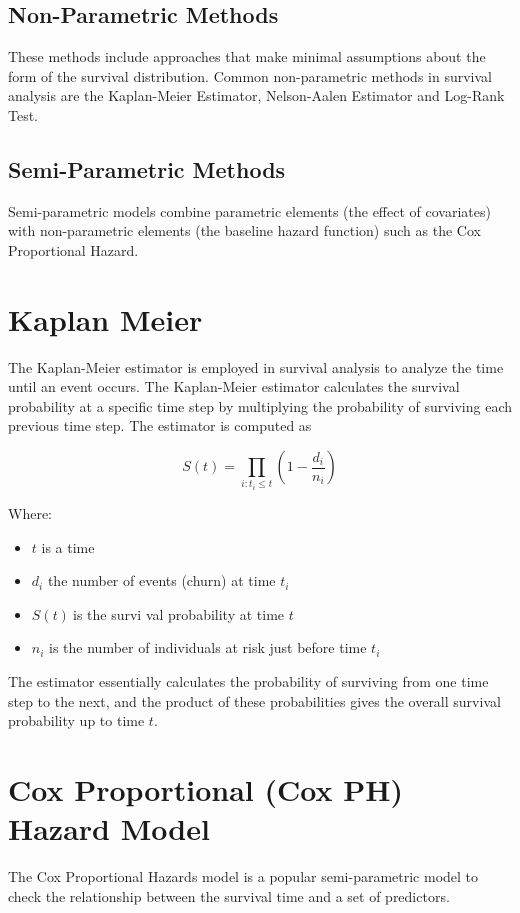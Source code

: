 \documentclass[doublespacing]{report} %
\begin{document}
\subsection{Non-Parametric Methods}

These methods include approaches that make minimal assumptions about the form of the survival distribution. Common non-parametric methods in survival analysis are the Kaplan-Meier Estimator, Nelson-Aalen Estimator and Log-Rank Test.

\subsection{Semi-Parametric Methods}

Semi-parametric models combine parametric elements (the effect of covariates) with non-parametric elements (the baseline hazard function) such as the Cox Proportional Hazard.

\section{Kaplan Meier}
The Kaplan-Meier estimator is employed in survival analysis to analyze the time until an event occurs. The Kaplan-Meier estimator calculates the survival probability at a specific time step by multiplying the probability of surviving each previous time step.
The estimator is computed as

\[S\left(t\right)=\prod_{i:t_i\le t}\left(1-\frac{d_i}{n_i}\right)\]

Where:
 \begin{itemize}
     \item \(t\) is a time
     \item \(d_i \) the number of events (churn) at time \(t_i\)
     \item \(S\left(t\right)\ \)is the survi val probability at time \(t\)
     \item \(n_i\) is the number of individuals at risk just before time \(t_i\)
 \end{itemize}
The estimator essentially calculates the probability of surviving from one time step to the next, and the product of these probabilities gives the overall survival probability up to time \(t\).

\section{Cox Proportional (Cox PH) Hazard Model}

The Cox Proportional Hazards model is a popular semi-parametric model to check the relationship between the survival time and a set of predictors.
\end{document}
